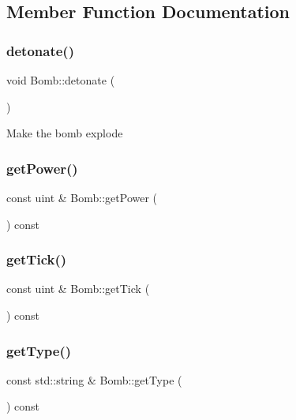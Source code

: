 \subsection{Member Function Documentation}
\mbox{\label{class_bomb_addbbd82f5617517df7afb272c654696c}} 
\subsubsection{\texorpdfstring{detonate()}{detonate()}}
{\footnotesize\ttfamily void Bomb\+::detonate (\begin{DoxyParamCaption}{ }\end{DoxyParamCaption})}

Make the bomb explode \mbox{\label{class_bomb_abd028c863bbfe28d8ef7a5e591ec4fb5}} 
\subsubsection{\texorpdfstring{getPower()}{getPower()}}
{\footnotesize\ttfamily const uint \& Bomb\+::get\+Power (\begin{DoxyParamCaption}{ }\end{DoxyParamCaption}) const}

\mbox{\label{class_bomb_a53ec5f4a56715ef504755c7d2acd150e}} 
\subsubsection{\texorpdfstring{getTick()}{getTick()}}
{\footnotesize\ttfamily const uint \& Bomb\+::get\+Tick (\begin{DoxyParamCaption}{ }\end{DoxyParamCaption}) const}

\mbox{\label{class_bomb_ad41df8612845397927acdb4cc4f13901}} 
\subsubsection{\texorpdfstring{getType()}{getType()}}
{\footnotesize\ttfamily const std\+::string \& Bomb\+::get\+Type (\begin{DoxyParamCaption}{ }\end{DoxyParamCaption}) const}

